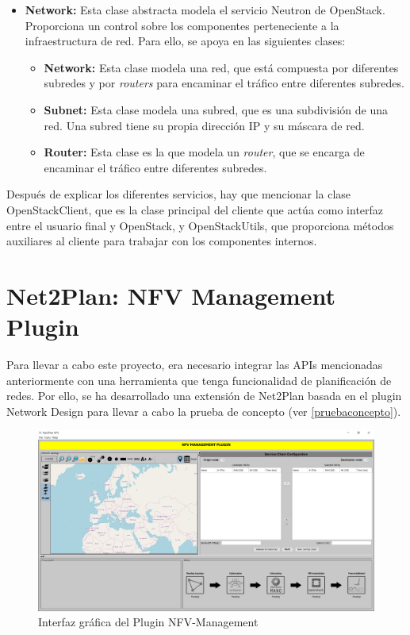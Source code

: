 \begin{itemize}
	\item \textbf{Network:} Esta clase abstracta modela el servicio Neutron de OpenStack. Proporciona un control sobre los componentes perteneciente a la infraestructura de red. Para ello, se apoya en las siguientes clases:
	
		\begin{itemize}
		
		\item \textbf{Network:} Esta clase modela una red, que está compuesta por diferentes subredes y por \textit{routers} para encaminar el tráfico entre diferentes subredes.
		
		\item \textbf{Subnet:} Esta clase modela una subred, que es una subdivisión de una red. Una subred tiene su propia dirección \ac{IP} y su máscara de red.
		
		\item \textbf{Router:} Esta clase es la que modela un \textit{router}, que se encarga de encaminar el tráfico entre diferentes subredes.
		
		\end{itemize}
	
\end{itemize}

Después de explicar los diferentes servicios, hay que mencionar la clase OpenStackClient, que es la clase principal del cliente que actúa como interfaz entre el usuario final y OpenStack, y OpenStackUtils, que proporciona métodos auxiliares al cliente para trabajar con los componentes internos.

\clearpage

\section{Net2Plan: NFV Management Plugin}
\label{sec:nfvplugin}

Para llevar a cabo este proyecto, era necesario integrar las APIs mencionadas anteriormente con una herramienta que tenga funcionalidad de planificación de redes. Por ello, se ha desarrollado una extensión de Net2Plan basada en el plugin Network Design para llevar a cabo la prueba de concepto (ver \ref{pruebaconcepto}). 


\begin{figure}[!ht]
	\centering
	\includegraphics[width=1\linewidth]{imagenes/nfvplugin_dashboard}
	\caption{Interfaz gráfica del Plugin NFV-Management}
	\label{fig:nfvplugindash}
\end{figure}

